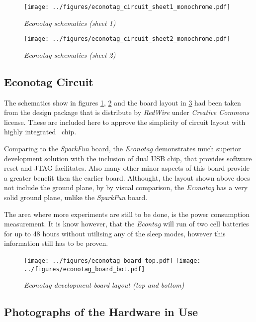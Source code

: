 \begin{figure}
\centering
\texttt{[image: ../figures/econotag\_circuit\_sheet1\_monochrome.pdf]}
\caption{\emph{Econotag schematics (sheet 1)}}\label{fig:econotag:circuit:s1}
\end{figure}

\begin{figure}
\centering
\texttt{[image: ../figures/econotag\_circuit\_sheet2\_monochrome.pdf]}
\caption{\emph{Econotag schematics (sheet 2)}}\label{fig:econotag:circuit:s2}
\end{figure}

\pagebreak
\subsection{Econotag Circuit}


  The schematics show in figures \ref{fig:econotag:circuit:s1},
  \ref{fig:econotag:circuit:s2} and
  the board layout in \ref{fig:econotag:layout} had been taken
  from the design package \cite{links:econotag:design} that is
  distribute by \emph{RedWire} under \emph{Creative Commons}
  license. These are included here to approve the simplicity
  of circuit layout with highly integrated \MCX\ chip.

   Comparing to the \emph{SparkFun} board, the \emph{Econotag}
  demonstrates much superior development solution with the
  inclusion of dual USB chip, that provides software reset and
  JTAG facilitates. Also many other minor aspects of this board
  provide a greater benefit then the earlier board. Althought,
  the layout shown above does not include the ground plane, by
  by visual comparison, the \emph{Econotag} has a very solid
  ground plane, unlike the \emph{SparkFun} board.

   The area where more experiments are still to be done, is the
  power consumption measurement. It is know however, that the
  \emph{Econtag} will run of two cell batteries for up to 48
  hours without utilising any of the sleep modes, however this
  information still has to be proven.


\begin{figure}
\centering
\texttt{[image: ../figures/econotag\_board\_top.pdf]}
\texttt{[image: ../figures/econotag\_board\_bot.pdf]}
\caption{\emph{Econotag development board layout (top and bottom)}} \label{fig:econotag:layout}
\end{figure}

\pagebreak
\subsection{Photographs of the Hardware in Use}

